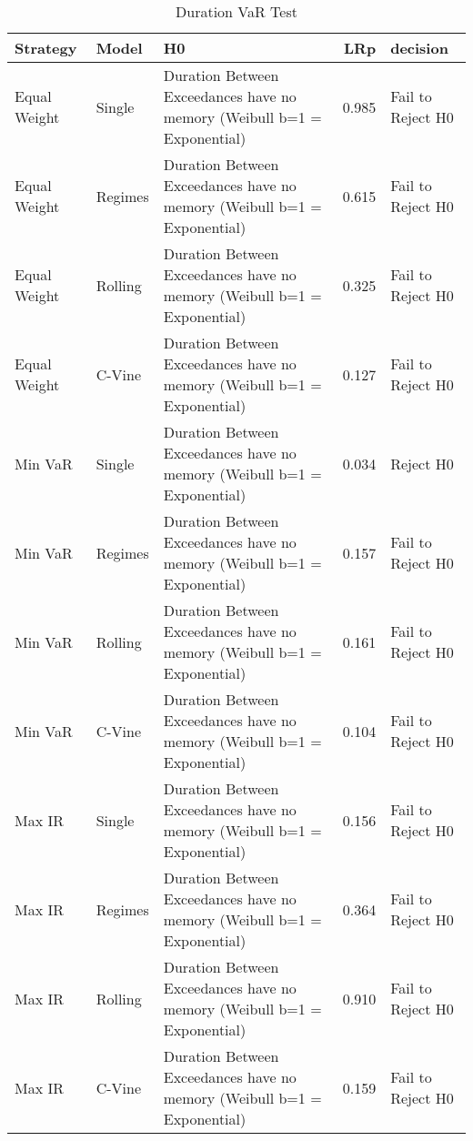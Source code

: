 \begin{table}

\caption{Duration VaR Test}
\centering
\begin{tabular}[t]{lllrl}
\toprule
Strategy & Model & H0 & LRp & decision\\
\midrule
Equal Weight & Single & Duration Between Exceedances have no memory (Weibull b=1 = Exponential) & 0.985 & Fail to Reject H0\\
Equal Weight & Regimes & Duration Between Exceedances have no memory (Weibull b=1 = Exponential) & 0.615 & Fail to Reject H0\\
Equal Weight & Rolling & Duration Between Exceedances have no memory (Weibull b=1 = Exponential) & 0.325 & Fail to Reject H0\\
Equal Weight & C-Vine & Duration Between Exceedances have no memory (Weibull b=1 = Exponential) & 0.127 & Fail to Reject H0\\
Min VaR & Single & Duration Between Exceedances have no memory (Weibull b=1 = Exponential) & 0.034 & Reject H0\\
\addlinespace
Min VaR & Regimes & Duration Between Exceedances have no memory (Weibull b=1 = Exponential) & 0.157 & Fail to Reject H0\\
Min VaR & Rolling & Duration Between Exceedances have no memory (Weibull b=1 = Exponential) & 0.161 & Fail to Reject H0\\
Min VaR & C-Vine & Duration Between Exceedances have no memory (Weibull b=1 = Exponential) & 0.104 & Fail to Reject H0\\
Max IR & Single & Duration Between Exceedances have no memory (Weibull b=1 = Exponential) & 0.156 & Fail to Reject H0\\
Max IR & Regimes & Duration Between Exceedances have no memory (Weibull b=1 = Exponential) & 0.364 & Fail to Reject H0\\
\addlinespace
Max IR & Rolling & Duration Between Exceedances have no memory (Weibull b=1 = Exponential) & 0.910 & Fail to Reject H0\\
Max IR & C-Vine & Duration Between Exceedances have no memory (Weibull b=1 = Exponential) & 0.159 & Fail to Reject H0\\
\bottomrule
\end{tabular}
\end{table}
